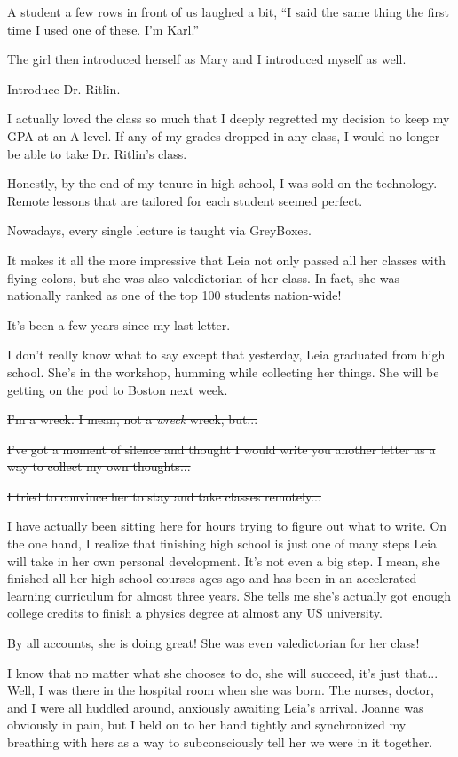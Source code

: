 A student a few rows in front of us laughed a bit, ``I said the same thing the first time I used one of these. I'm Karl.''

The girl then introduced herself as Mary and I introduced myself as well.

Introduce Dr. Ritlin.

I actually loved the class so much that I deeply regretted my decision to keep my GPA at an A level.
If any of my grades dropped in any class, I would no longer be able to take Dr. Ritlin's class.

Honestly, by the end of my tenure in high school, I was sold on the technology.
Remote lessons that are tailored for each student seemed perfect.

Nowadays, every single lecture is taught via GreyBoxes.

It makes it all the more impressive that Leia not only passed all her classes with flying colors, but she was also valedictorian of her class.
In fact, she was nationally ranked as one of the top 100 students nation-wide!

It's been a few years since my last letter.

I don't really know what to say except that yesterday, Leia graduated from high school.
She's in the workshop, humming while collecting her things.
She will be getting on the pod to Boston next week.

\sout{I'm a wreck. I mean, not a \textit{wreck} wreck, but...}

\sout{I've got a moment of silence and thought I would write you another letter as a way to collect my own thoughts...}

\sout{I tried to convince her to stay and take classes remotely...}

I have actually been sitting here for hours trying to figure out what to write.
On the one hand, I realize that finishing high school is just one of many steps Leia will take in her own personal development.
It's not even a big step.
I mean, she finished all her high school courses ages ago and has been in an accelerated learning curriculum for almost three years.
She tells me she's actually got enough college credits to finish a physics degree at almost any US university.

By all accounts, she is doing great!
She was even valedictorian for her class!

I know that no matter what she chooses to do, she will succeed, it's just that...
Well, I was there in the hospital room when she was born.
The nurses, doctor, and I were all huddled around, anxiously awaiting Leia's arrival.
Joanne was obviously in pain, but I held on to her hand tightly and synchronized my breathing with hers as a way to subconsciously tell her we were in it together.

